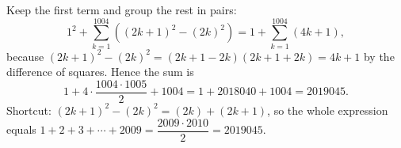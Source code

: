 Keep the first term and group the rest in pairs:
\[
1^2+\sum_{k=1}^{1004}\left((2k+1)^2-(2k)^2\right)=1+\sum_{k=1}^{1004}(4k+1),
\]
because $(2k+1)^2-(2k)^2=(2k+1-2k)(2k+1+2k)=4k+1$ by the difference of squares. Hence the sum is
\[
1+4\cdot\dfrac{1004\cdot1005}{2}+1004=1+2018040+1004=\boxed{2019045}.
\]
Shortcut: $(2k+1)^2-(2k)^2=(2k)+(2k+1)$, so the whole expression equals $1+2+3+\cdots+2009=\dfrac{2009\cdot2010}{2}=2019045$.
